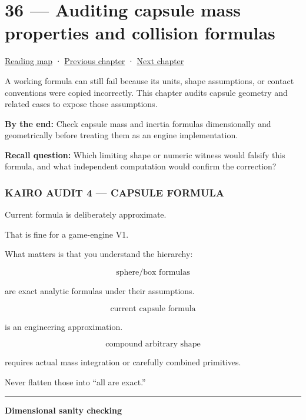 \hypertarget{06-engine-ii-ch036}{}
\chapter{36 --- Auditing capsule mass properties and collision formulas}\label{06-engine-ii-ch036-auditing-capsule-mass-properties-and-collision-formulas}

\hyperref[volume-reading-map]{Reading map} · \hyperref[06-engine-ii-ch035]{Previous chapter} · \hyperref[06-engine-ii-ch037]{Next chapter}

A working formula can still fail because its units, shape assumptions, or contact conventions were copied incorrectly. This chapter audits capsule geometry and related cases to expose those assumptions.

\textbf{By the end:} Check capsule mass and inertia formulas dimensionally and geometrically before treating them as an engine implementation.

\textbf{Recall question:} Which limiting shape or numeric witness would falsify this formula, and what independent computation would confirm the correction?

\subsection{KAIRO AUDIT 4 --- CAPSULE FORMULA}\label{06-engine-ii-ch036-kairo-audit-4-capsule-formula}

Current formula is deliberately approximate.

That is fine for a game-engine V1.

What matters is that you understand the hierarchy:

\[
\text{sphere/box formulas}
\]

are exact analytic formulas under their assumptions.

\[
\text{current capsule formula}
\]

is an engineering approximation.

\[
\text{compound arbitrary shape}
\]

requires actual mass integration or carefully combined primitives.

Never flatten those into ``all are exact.''

\begin{center}\rule{0.5\linewidth}{0.5pt}\end{center}

\textbf{Dimensional sanity checking}

